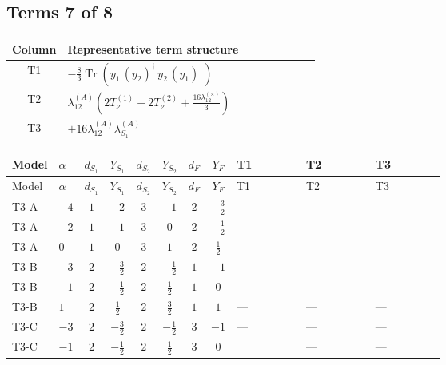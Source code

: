 \documentclass[8pt]{article}
\begin{document}
\begin{landscape}
\subsection*{Terms 7 of 8}
\begin{center}
\begin{tabular}{@{}c >{\raggedright\arraybackslash}p{0.82\linewidth}@{}}
\toprule
Column & Representative term structure \\
\midrule
T1 & \(\displaystyle -\frac{8}{3} \operatorname{Tr}\!\left({y_1}\,\left({y_2}\right)^{\dagger}\,{y_2}\,\left({y_1}\right)^{\dagger}\right)\) \\
\midrule
T2 & \(\displaystyle {\lambda_{12}^{(A)}} \left(2 T_{\nu}^{(1)}+2 T_{\nu}^{(2)}+\frac{16 {\lambda_{12}^{(\times)}}}{3}\right)\) \\
\midrule
T3 & \(\displaystyle +16 {\lambda_{12}^{(A)}} {\lambda_{S_1}^{(A)}}\) \\
\midrule
\bottomrule
\end{tabular}
\end{center}
\smallskip
\tiny
\begin{longtable}{@{}llcccccc >{\raggedright\arraybackslash}p{0.21\linewidth} >{\raggedright\arraybackslash}p{0.21\linewidth} >{\raggedright\arraybackslash}p{0.21\linewidth}@{}}
\toprule
Model & $\alpha$ & $d_{S_1}$ & $Y_{S_1}$ & $d_{S_2}$ & $Y_{S_2}$ & $d_F$ & $Y_F$ & T1 & T2 & T3 \\
\midrule
\endfirsthead
\toprule
Model & $\alpha$ & $d_{S_1}$ & $Y_{S_1}$ & $d_{S_2}$ & $Y_{S_2}$ & $d_F$ & $Y_F$ & T1 & T2 & T3 \\
\midrule
\endhead
T3-A & $-4$ & $1$ & $-2$ & $3$ & $-1$ & $2$ & $-\frac{3}{2}$ & --- & --- & --- \\
\midrule
T3-A & $-2$ & $1$ & $-1$ & $3$ & $0$ & $2$ & $-\frac{1}{2}$ & --- & --- & --- \\
\midrule
T3-A & $0$ & $1$ & $0$ & $3$ & $1$ & $2$ & $\frac{1}{2}$ & --- & --- & --- \\
\midrule
T3-B & $-3$ & $2$ & $-\frac{3}{2}$ & $2$ & $-\frac{1}{2}$ & $1$ & $-1$ & --- & --- & --- \\
\midrule
T3-B & $-1$ & $2$ & $-\frac{1}{2}$ & $2$ & $\frac{1}{2}$ & $1$ & $0$ & --- & --- & --- \\
\midrule
T3-B & $1$ & $2$ & $\frac{1}{2}$ & $2$ & $\frac{3}{2}$ & $1$ & $1$ & --- & --- & --- \\
\midrule
T3-C & $-3$ & $2$ & $-\frac{3}{2}$ & $2$ & $-\frac{1}{2}$ & $3$ & $-1$ & --- & --- & --- \\
\midrule
T3-C & $-1$ & $2$ & $-\frac{1}{2}$ & $2$ & $\frac{1}{2}$ & $3$ & $0$ & \scriptsize\adjustbox{max width=\linewidth}{$\begin{gathered} -\frac{8}{3} \operatorname{Tr}\!\left({y_1}\,\left({y_2}\right)^{\dagger}\,{y_2}\,\left({y_1}\right)^{\dagger}\right)\end{gathered}$} & --- & --- \\

\end{longtable}
\end{landscape}
\end{document}
